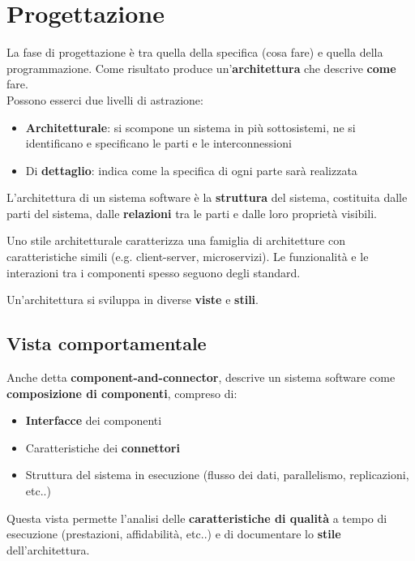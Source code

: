 \newpage
\section{Progettazione}
La fase di progettazione è tra quella della specifica (cosa fare) e quella della programmazione. Come risultato produce un'\textbf{architettura} che descrive \textbf{come} fare.\\
Possono esserci due livelli di astrazione:
\begin{itemize}
	\item \textbf{Architetturale}: si scompone un sistema in più sottosistemi, ne si identificano e specificano le parti e le interconnessioni
	\item Di \textbf{dettaglio}: indica come la specifica di ogni parte sarà realizzata
\end{itemize}

\begin{definition}
	L’architettura di un sistema software è la \textbf{struttura} del sistema, costituita dalle parti del sistema, dalle \textbf{relazioni} tra le parti e dalle loro proprietà visibili.
\end{definition}

\begin{definition}
	Uno stile architetturale caratterizza una famiglia di architetture con caratteristiche simili (e.g. client-server, microservizi). Le funzionalità e le interazioni tra i componenti spesso seguono degli standard.
\end{definition}

Un'architettura si sviluppa in diverse \textbf{viste} e \textbf{stili}.

\subsection{Vista comportamentale}
Anche detta \textbf{component-and-connector}, descrive un sistema software come \textbf{composizione di componenti}, compreso di:
\begin{itemize}
	\item \textbf{Interfacce} dei componenti
	\item Caratteristiche dei \textbf{connettori}
	\item Struttura del sistema in esecuzione (flusso dei dati, parallelismo, replicazioni, etc..)
\end{itemize}
Questa vista permette l'analisi delle \textbf{caratteristiche di qualità} a tempo di esecuzione (prestazioni, affidabilità, etc..) e di documentare lo \textbf{stile} dell'architettura.


